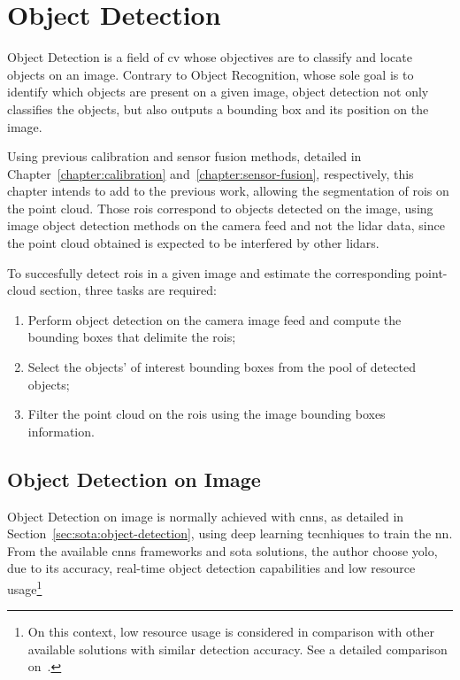 \chapter{Object Detection}
\label{chapter:object-detection}

Object Detection is a field of \acf{cv} whose objectives are to classify and locate objects on an image. Contrary to Object Recognition, whose sole goal is to identify which objects are present on a given image, object detection not only classifies the objects, but also outputs a bounding box and its position on the image. 

Using previous calibration and sensor fusion methods, detailed in Chapter~\ref{chapter:calibration} and~\ref{chapter:sensor-fusion}, respectively, this chapter intends to add to the previous work, allowing the segmentation of \acfp{roi} on the point cloud. Those \acp{roi} correspond to objects detected on the image, using image object detection methods on the camera feed and not the \ac{lidar} data, since the point cloud obtained is expected to be interfered by other \acp{lidar}.

To succesfully detect \acp{roi} in a given image and estimate the corresponding point-cloud section, three tasks are required: 
\begin{enumerate}
	\item Perform object detection on the camera image feed and compute the bounding boxes that delimite the \acp{roi};
	\item Select the objects' of interest bounding boxes from the pool of detected objects;
	\item Filter the point cloud on the \acp{roi} using the image bounding boxes information.
\end{enumerate}

\section{Object Detection on Image}
\label{sec:object-detection:image}

Object Detection on image is normally achieved with \acfp{cnn}, as detailed in Section~\ref{sec:sota:object-detection}, using deep learning tecnhiques to train the \acl{nn}. From the available \acp{cnn} frameworks and \acl{sota} solutions, the author choose \ac{yolo}, due to its accuracy, real-time object detection capabilities and low resource usage\footnote{On this context, low resource usage is considered in comparison with other available solutions with similar detection accuracy. See a detailed comparison on~\cite{Redmon2018}.}~\cite{Redmon2016, Redmon2017}

